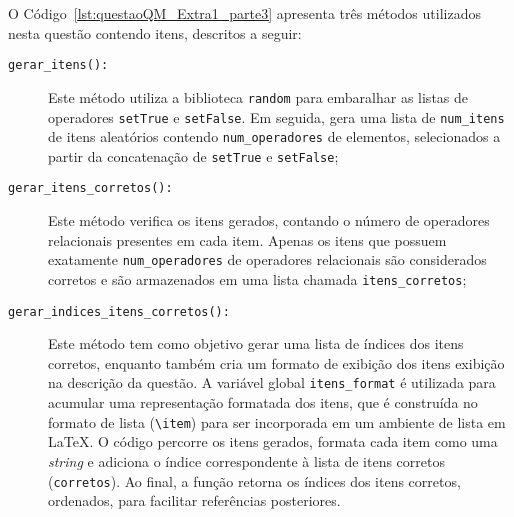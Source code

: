 O Código~\ref{lst:questaoQM_Extra1_parte3} apresenta três métodos utilizados nesta questão contendo itens, descritos a seguir:

\begin{description}
    \item[\texttt{gerar\_itens():}]
    Este método utiliza a biblioteca \verb|random| para embaralhar as listas de operadores \verb|setTrue| e \verb|setFalse|. Em seguida, gera uma lista de \verb|num_itens| de itens aleatórios contendo \verb|num_operadores| de elementos, selecionados a partir da concatenação de \verb|setTrue| e \verb|setFalse|;

    \item[\texttt{gerar\_itens\_corretos():}]
    Este método verifica os itens gerados, contando o número de operadores relacionais presentes em cada item. Apenas os itens que possuem exatamente \verb|num_operadores| de operadores relacionais são considerados corretos e são armazenados em uma lista chamada \verb|itens_corretos|;

    \item[\texttt{gerar\_indices\_itens\_corretos():}]
    Este método tem como objetivo gerar uma lista de índices dos itens corretos, enquanto também cria um formato de exibição dos itens exibição na descrição da questão. A variável global \verb|itens_format| é utilizada para acumular uma representação formatada dos itens, que é construída no formato de lista (\texttt{\textbackslash item}) para ser incorporada em um ambiente de lista em \LaTeX. O código percorre os itens gerados, formata cada item como uma \textit{string} e adiciona o índice correspondente à lista de itens corretos (\verb|corretos|). Ao final, a função retorna os índices dos itens corretos, ordenados, para facilitar referências posteriores.
\end{description}

